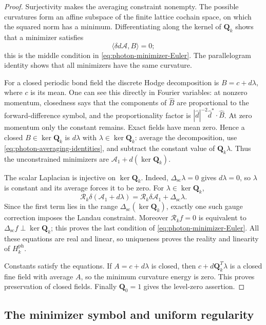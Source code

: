 \documentclass[11pt,letterpaper,reqno]{amsart}
\begin{document}
\begin{proof}
Surjectivity makes the averaging constraint nonempty. The possible
curvatures form an affine subspace of the finite lattice cochain space,
on which the squared norm has a minimum.
Differentiating along the kernel of $\mathbf Q_k$ shows that a
minimizer satisfies
\[
 \langle\delta d\mathscr A,B\rangle=0;
\]
this is the middle
condition in \eqref{eq:photon-minimizer-Euler}. The parallelogram
identity shows that all minimizers have the same curvature.

For a closed periodic bond field the discrete Hodge decomposition is
$B=c+d\lambda$, where $c$ is its mean. One can see this directly in
Fourier variables: at nonzero momentum, closedness says that the
components of $\widehat B$ are proportional to the forward-difference
symbol, and the proportionality factor is
$|\widehat d|^{-2}\widehat d^*\cdot\widehat B$. At zero momentum
only the constant remains. Exact fields have mean zero. Hence a closed
$B\in\ker\mathbf Q_k$ is $d\lambda$ with
$\lambda\in\ker\mathbf Q_k$: average the decomposition, use
\eqref{eq:photon-averaging-identities}, and subtract the constant value
of $\mathbf Q_k\lambda$. Thus the unconstrained minimizers are
$\mathscr A_1+d(\ker\mathbf Q_k)$.

The scalar Laplacian is injective on $\ker\mathbf Q_k$. Indeed,
$\Delta_{\mathrm{sc}}\lambda=0$ gives $d\lambda=0$, so $\lambda$
is constant and its average forces it to be zero. For
$\lambda\in\ker\mathbf Q_k$,
\[
 \mathcal R_k\delta(\mathscr A_1+d\lambda)
       =\mathcal R_k\delta\mathscr A_1+\Delta_{\mathrm{sc}}\lambda.
\]
Since the first term lies in the range
$\Delta_{\mathrm{sc}}(\ker\mathbf Q_k)$, exactly one such gauge
correction imposes the Landau constraint. Moreover
$\mathcal R_kf=0$ is equivalent to
$\Delta_{\mathrm{sc}}f\perp\ker\mathbf Q_k$; this proves the last
condition of \eqref{eq:photon-minimizer-Euler}.
All these equations are real and linear, so uniqueness proves the
reality and linearity of $H_k^{\mathrm{ph}}$.

Constants satisfy the equations. If $A=c+d\lambda$ is closed, then
$c+d\mathbf Q_k^T\lambda$ is a closed fine field with average $A$,
so the minimum curvature energy is zero. This proves preservation of
closed fields. Finally $\mathbf Q_0=1$ gives the level-zero assertion.
\end{proof}

\subsection{The minimizer symbol and uniform regularity}
\label{subsec:photon-symbol-regularity}
\end{document}

